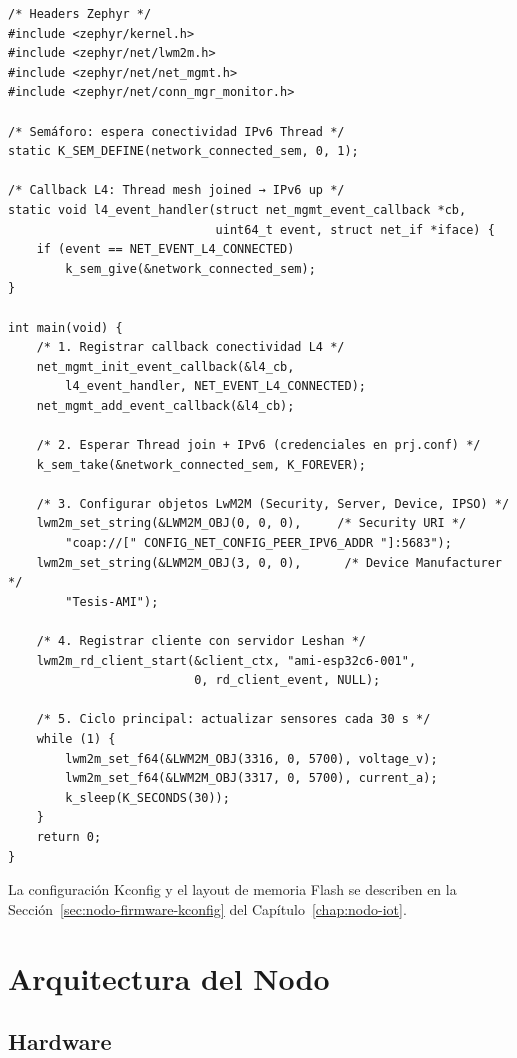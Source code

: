 \begin{verbatim}
/* Headers Zephyr */
#include <zephyr/kernel.h>
#include <zephyr/net/lwm2m.h>
#include <zephyr/net/net_mgmt.h>
#include <zephyr/net/conn_mgr_monitor.h>

/* Semáforo: espera conectividad IPv6 Thread */
static K_SEM_DEFINE(network_connected_sem, 0, 1);

/* Callback L4: Thread mesh joined → IPv6 up */
static void l4_event_handler(struct net_mgmt_event_callback *cb,
                             uint64_t event, struct net_if *iface) {
    if (event == NET_EVENT_L4_CONNECTED)
        k_sem_give(&network_connected_sem);
}

int main(void) {
    /* 1. Registrar callback conectividad L4 */
    net_mgmt_init_event_callback(&l4_cb,
        l4_event_handler, NET_EVENT_L4_CONNECTED);
    net_mgmt_add_event_callback(&l4_cb);

    /* 2. Esperar Thread join + IPv6 (credenciales en prj.conf) */
    k_sem_take(&network_connected_sem, K_FOREVER);

    /* 3. Configurar objetos LwM2M (Security, Server, Device, IPSO) */
    lwm2m_set_string(&LWM2M_OBJ(0, 0, 0),     /* Security URI */
        "coap://[" CONFIG_NET_CONFIG_PEER_IPV6_ADDR "]:5683");
    lwm2m_set_string(&LWM2M_OBJ(3, 0, 0),      /* Device Manufacturer */
        "Tesis-AMI");

    /* 4. Registrar cliente con servidor Leshan */
    lwm2m_rd_client_start(&client_ctx, "ami-esp32c6-001",
                          0, rd_client_event, NULL);

    /* 5. Ciclo principal: actualizar sensores cada 30 s */
    while (1) {
        lwm2m_set_f64(&LWM2M_OBJ(3316, 0, 5700), voltage_v);
        lwm2m_set_f64(&LWM2M_OBJ(3317, 0, 5700), current_a);
        k_sleep(K_SECONDS(30));
    }
    return 0;
}
\end{verbatim}

La configuración Kconfig y el layout de memoria Flash se describen en la Sección~\ref{sec:nodo-firmware-kconfig} del Capítulo~\ref{chap:nodo-iot}.

\section{Arquitectura del Nodo}

\subsection{Hardware}

